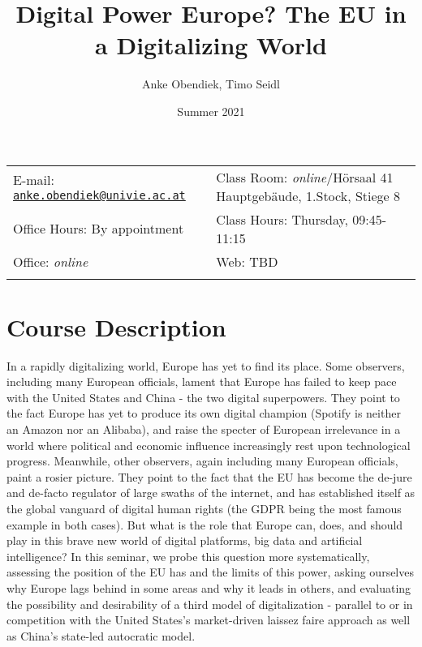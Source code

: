\documentclass[12pt,]{article}
\title{Digital Power Europe? The EU in a Digitalizing World}
\author{Anke Obendiek, Timo Seidl}
\date{Summer 2021}
\begin{document}
  

		\maketitle
		
	
		\thispagestyle{firststyle}



\begin{tabular*}{\textwidth}{p{} p{}}

E-mail: \texttt{\href{mailto:anke.obendiek@univie.ac.at}{\nolinkurl{anke.obendiek@univie.ac.at}}} & Class Room: \emph{online}/Hörsaal
41 Hauptgebäude, 1.Stock, Stiege 8\\
Office Hours: By appointment  &  Class Hours: Thursday, 09:45-11:15\\
Office: \emph{online}  &  Web: TBD\\
	&  \\
	\hline
	\end{tabular*}
	
\vspace{2mm}
	


\hypertarget{course-description}{%
\section{Course Description}\label{course-description}}

In a rapidly digitalizing world, Europe has yet to find its place. Some
observers, including many European officials, lament that Europe has
failed to keep pace with the United States and China - the two digital
superpowers. They point to the fact Europe has yet to produce its own
digital champion (Spotify is neither an Amazon nor an Alibaba), and
raise the specter of European irrelevance in a world where political and
economic influence increasingly rest upon technological progress.
Meanwhile, other observers, again including many European officials,
paint a rosier picture. They point to the fact that the EU has become
the de-jure and de-facto regulator of large swaths of the internet, and
has established itself as the global vanguard of digital human rights
(the GDPR being the most famous example in both cases). But what is the
role that Europe can, does, and should play in this brave new world of
digital platforms, big data and artificial intelligence? In this
seminar, we probe this question more systematically, assessing the
position of the EU has and the limits of this power, asking ourselves
why Europe lags behind in some areas and why it leads in others, and
evaluating the possibility and desirability of a third model of
digitalization - parallel to or in competition with the United States's
market-driven laissez faire approach as well as China's state-led
autocratic model.
\end{document}
